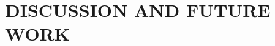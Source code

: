 \documentclass[dissertation,copyright,draftimages,final,numbers,sort&compress,gsmodern]{uothesis}
\theoremstyle{definition}
\theoremstyle{definition}
\begin{document}

\chapter{DISCUSSION AND FUTURE WORK}
\label{chap:discussion}


%
%
%

%



\end{document}
